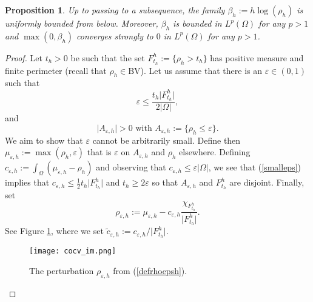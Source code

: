 \documentclass[12pt, a4paper]{article}
\numberwithin{equation}{section}
\theoremstyle{plain}
\newtheorem{prop}[thm]{Proposition}
\theoremstyle{definition}
\theoremstyle{remark}
\newcommand\eps{\varepsilon}
\newcommand\brho{\overline{\rho}}
\newcommand{\BV}{\mathrm{BV}}
\newcommand\pref[1]{(\ref{#1})}
\begin{document}


\begin{prop}\label{boundbelowh}
Up to passing to a subsequence, the family $\beta_h :=h\log(\rho_h)$ is uniformly bounded from below. Moreover, $\beta_h$ is  bounded in $L^{p}(\Omega)$ for any $p>1$ and $\max(0, \beta_h)$ converges strongly to $0$  in $L^{p}(\Omega)$ for any $p>1$. 


\end{prop}


\begin{proof}
Let $t_h>0$ be such that the set $F_{t_h}^h := \{\rho_h >t_h\}$ has positive measure and finite perimeter (recall that $\rho_h\in \BV$). Let us assume that there is  an $\eps\in (0,1)$ such that 
\begin{equation}\label{smalleps}
 \eps  \le \frac{t_h \vert F_{t_h}^h \vert }{2\vert \Omega\vert}, 
\end{equation}
and
\begin{equation}
\vert A_{\eps, h}\vert >0 \mbox{ with } A_{\eps,h}:=\{\rho_h \le \eps\}.
\end{equation}
We aim to show that $\eps$ cannot be arbitrarily small.
Define then $\mu_{\eps, h}:=\max( \rho_h, \eps)$ that is $\eps$ on $A_{\eps, h}$ and $\rho_h$ elsewhere. Defining $c_{\eps,h}:=\int_{\Omega} (\mu_{\eps,h}- \rho_h)$ and observing that $c_{\eps,h} \le \eps \vert \Omega\vert $, we see that  \pref{smalleps} implies that $c_{\eps,h}\le \frac{1}{2} t_h \vert F_{t_h}^h \vert$ and $t_h \ge 2 \eps$ so that $A_{\eps,h}$ and $F_{t_h}^h$ are disjoint. Finally, set
\begin{equation}\label{defrhoepsh}
\rho_{\eps,h}:=\mu_{\eps,h}-c_{\eps,h} \frac{  \chi_{F_{t_h}^h}}{ \vert F_{t_h}^h\vert}.
\end{equation}
See Figure \ref{figrhoepsh}, where we set $\tilde c_{\eps,h} :=  c_{\eps,h}/ \vert F_{t_h}^h\vert$.


\begin{figure}
\texttt{[image: cocv\_im.png]}
\caption{The perturbation $\rho_{\eps, h}$ from  \pref{defrhoepsh}. \label{figrhoepsh}}
\end{figure}


\smallskip


\end{proof}
\end{document}
